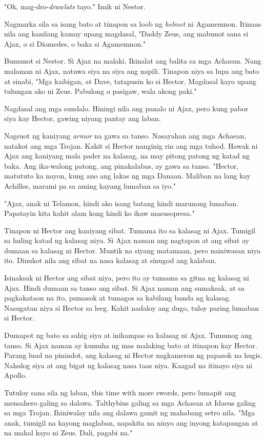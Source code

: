 \documentclass[12pt,letterpaper]{report}
\begin{document}
"Ok, mag-dro-\textit{drawlats} tayo." Imik ni Nestor.

Nagmarka sila sa isang bato at tinapon sa loob ng \textit{helmet} ni Agamemnon. Itinaas nila ang kanilang kamay upang magdasal, "Daddy Zeus, ang mabunot sana si Ajax, o si Diomedes, o baka si Agamemnon."

Bumunot si Nestor. Si Ajax na malaki. Ikinalat ang balita sa mga Achaean. Nang malaman ni Ajax, natuwa siya na siya ang napili. Tinapon niya sa lupa ang bato at sinabi, "Mga kaibigan, at Dave, tatapusin ko si Hector. Magdasal kayo upang tulungan ako ni Zeus. Pabulong o pasigaw, wala akong paki."

Nagdasal ang mga sundalo. Hiningi nila ang panalo ni Ajax, pero kung pabor siya kay Hector, gawing niyang pantay ang laban. 

Nagsuot ng kaniyang \textit{armor} na gawa sa tanso. Nasayahan ang mga Achaean, natakot ang mga Trojan. Kahit si Hector nanginig rin ang mga tuhod. Hawak ni Ajax ang kaniyang mala pader na kalasag, na may pitong patong ng katad ng baka. Ang ika-walong patong, ang pinakalabas, ay gawa sa tanso. "Hector, matututo ka nayon, kung ano ang lakas ng mga Danaan. Maliban na lang kay Achilles, marami pa sa aming kayang lumaban sa iyo."

"Ajax, anak ni Telamon, hindi ako isang batang hindi marunong lumaban. Papatayin kita kahit alam kong hindi ko ikaw masusopresa."

Tinapon ni Hector ang kaniyang sibat. Tumama ito sa kalasag ni Ajax. Tumigil sa huling katad ng kalasag niya. Si Ajax naman ang nagtapon at ang sibat ay dumaan sa kalasag ni Hector. Muntik na siyang matamaan, pero nainiwasan niya ito. Dinukot nila ang sibat na nasa kalasag at sinugod ang kalaban.

Isinaksak ni Hector ang sibat niya, pero ito ay tumama sa gitna ng kalasag ni Ajax. Hindi dumaan sa tanso ang sibat. Si Ajax naman ang sumaksak, at sa pagkakataon na ito, pumasok at tumagos sa kabilang banda ng kalasag. Nasugatan niya si Hector sa leeg. Kahit nadaloy ang dugo, tuloy paring lumaban si Hector.

Dumapot ng bato sa sahig siya at inihampas sa kalasag ni Ajax. Tumunog ang tanso. Si Ajax naman ay kumuha ng mas malaking bato at itinapon kay Hector. Parang luad na pinindot, ang kalasag ni Hector nagkameron ng papasok na hugis. Nahulog siya at ang bigat ng kalasag nasa taas niya. Kaagad na itinayo siya ni Apollo.

Tutuloy sana sila ng laban, this time with more swords, pero lumapit ang mensahero galing sa dalawa. Talthybius galing sa mga Achaean at Idaeus galing sa mga Trojan. Ihiniwalay nila ang dalawa gamit ng mahabang setro nila. "Mga anak, tumigil na kayong maglaban, napakita na ninyo ang inyong katapangan at na mahal kayo ni Zeus. Dali, pagabi na."
\end{document}
